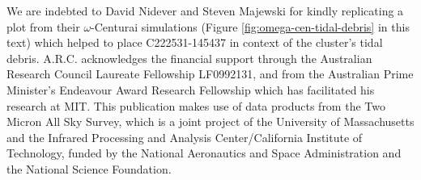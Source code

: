 \documentclass{emulateapj}
\begin{document}
\acknowledgements
We are indebted to David Nidever and Steven Majewski for kindly replicating a plot from their $\omega$-Centurai simulations (Figure \ref{fig:omega-cen-tidal-debris} in this text) which helped to place {C222531-145437} in context of the cluster's tidal debris. A.R.C. acknowledges the financial support through the Australian Research Council Laureate Fellowship LF0992131, and from the Australian Prime Minister's Endeavour Award Research Fellowship which has facilitated his research at MIT. This publication makes use of data products from the Two Micron All Sky Survey, which is a joint project of the University of Massachusetts and the Infrared Processing and Analysis Center/California Institute of Technology, funded by the National Aeronautics and Space Administration and the National Science Foundation. \\





\end{document}
